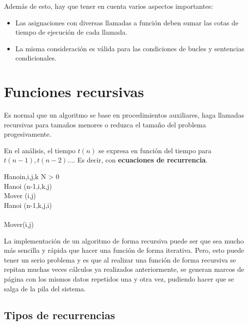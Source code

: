 \documentclass[10pt,a4paper,spanish]{report}
\theoremstyle{definition}
\theoremstyle{remark}
\begin{document}
    Además de esto, hay que tener en cuenta varios aspectos importantes:

    \begin{itemize}
        \item Las asignaciones con diversas llamadas a función deben sumar las cotas de tiempo de ejecución de cada llamada.
        \item La misma consideración es válida para las condiciones de bucles y sentencias condicionales.
    \end{itemize}

    \section{\textcolor{YellowOrange}Funciones recursivas}

    Es normal que un algoritmo se base en procedimientos auxiliares, haga llamadas recursivas para tamaños menores o reduzca el tamaño del problema progesivamente.

    En el análisis, el tiempo $t(n)$ se expresa en función del tiempo para $t(n-1), t(n-2)...$. Es decir, con \textbf{\textcolor{YellowOrange}{ecuaciones de recurrencia}}.
    \label{hanoi}

    \begin{pseudocode}{Hanoi}{n,i,j,k}
            \IF N > 0 \\\THEN
                \BEGIN
                    Hanoi (n-1,i,k,j)\\
                    Mover (i,j)\\
                    Hanoi (n-1,k,j,i)\\
                \END\\
            \ELSE
                Mover(i,j)
        \end{pseudocode}

    La implementación de un algoritmo de forma recursiva puede ser que sea mucho más sencilla y rápida que hacer una función de forma iterativa. Pero, esto puede tener un serio problema y es que al realizar una función de forma recursiva se repitan muchas veces cálculos ya realizados anteriormente, se generan marcos de página con los mismos datos repetidos una y otra vez, pudiendo hacer que se salga de la pila del sistema.

    \subsection{\textcolor{YellowOrange}Tipos de recurrencias}
\end{document}
